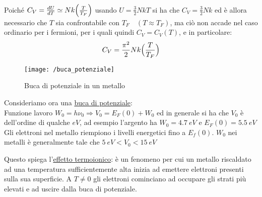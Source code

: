 Poiché $C_V = \frac{ dU}{dT} \simeq N k \Bigl(  \frac{ T}{T_F}  \Bigr) $ usando $U = \frac{ 3}{2} N k T$ si ha che $C_V = \frac{ 3}{2} N k$ 
ed è allora necessario che $T$ sia confrontabile con $T_F \quad (T \approx T_F)$, ma ciò non accade nel caso ordinario per i fermioni,
per i quali quindi $C_V = C_V(T)$, e in particolare:
\begin{equation}
C_V = \frac{ \pi^2}{2} N k \Bigl(  \frac{ T}{T_F}  \Bigr)
\end{equation}

\begin{figure}[h]
\centering
\texttt{[image: /buca\_potenziale]}
\caption{Buca di potenziale in un metallo}
\end{figure}

Consideriamo ora una \underline{buca di potenziale}: \\

Funzione lavoro $W_0 = h\nu_0 \Rightarrow V_0 = E_F(0) + W_0$ ed in generale si ha che $V_0$ è dell'ordine di qualche $eV$,
ad esempio l'argento ha $W_0 = \SI{4.7}{eV}$ e $ E_F(0) = \SI{5.5}{eV} $
Gli elettroni nel metallo riempiono i livelli energetici fino a $E_f(0)$. 
$W_0$ nei metalli è generalmente tale che $\SI{5}{eV} < V_0 < \SI{15}{eV} $

Questo spiega l'\underline{effetto termoionico}: è un fenomeno per cui un metallo riscaldato ad una temperatura sufficientemente alta inizia ad emettere elettroni presenti sulla sua superficie. A $T \not = 0 $ gli elettroni cominciano ad occupare gli strati più elevati e ad uscire dalla buca di potenziale.
















